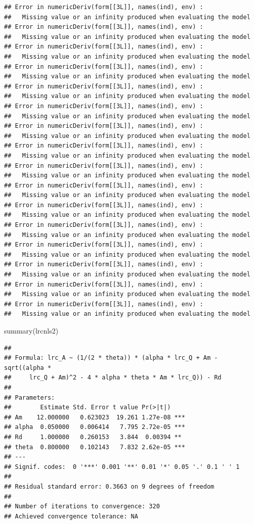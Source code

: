 \documentclass[
]{krantz}
\makeatletter
\newenvironment{Shaded}{\begin{snugshade}}{\end{snugshade}}
\newcommand{\FunctionTok}[1]{\textcolor[rgb]{0.00,0.00,0.00}{#1}}
\newcommand{\NormalTok}[1]{#1}
\newenvironment{kframe}{%
\medskip{}
\setlength{\fboxsep}{.8em}
 \def\at@end@of@kframe{}%
 \ifinner\ifhmode%
  \def\at@end@of@kframe{\end{minipage}}%
  \begin{minipage}{\columnwidth}%
 \fi\fi%
 \def\FrameCommand##1{\hskip\@totalleftmargin \hskip-\fboxsep
 \colorbox{shadecolor}{##1}\hskip-\fboxsep
     \hskip-\linewidth \hskip-\@totalleftmargin \hskip\columnwidth}%
 \MakeFramed {\advance\hsize-\width
   \@totalleftmargin\z@ \linewidth\hsize
   \@setminipage}}%
 {\par\unskip\endMakeFramed%
 \at@end@of@kframe}
\renewenvironment{Shaded}{\begin{kframe}}{\end{kframe}}
\makeatother
\begin{document}
\begin{verbatim}
## Error in numericDeriv(form[[3L]], names(ind), env) : 
##   Missing value or an infinity produced when evaluating the model
## Error in numericDeriv(form[[3L]], names(ind), env) : 
##   Missing value or an infinity produced when evaluating the model
## Error in numericDeriv(form[[3L]], names(ind), env) : 
##   Missing value or an infinity produced when evaluating the model
## Error in numericDeriv(form[[3L]], names(ind), env) : 
##   Missing value or an infinity produced when evaluating the model
## Error in numericDeriv(form[[3L]], names(ind), env) : 
##   Missing value or an infinity produced when evaluating the model
## Error in numericDeriv(form[[3L]], names(ind), env) : 
##   Missing value or an infinity produced when evaluating the model
## Error in numericDeriv(form[[3L]], names(ind), env) : 
##   Missing value or an infinity produced when evaluating the model
## Error in numericDeriv(form[[3L]], names(ind), env) : 
##   Missing value or an infinity produced when evaluating the model
## Error in numericDeriv(form[[3L]], names(ind), env) : 
##   Missing value or an infinity produced when evaluating the model
## Error in numericDeriv(form[[3L]], names(ind), env) : 
##   Missing value or an infinity produced when evaluating the model
## Error in numericDeriv(form[[3L]], names(ind), env) : 
##   Missing value or an infinity produced when evaluating the model
## Error in numericDeriv(form[[3L]], names(ind), env) : 
##   Missing value or an infinity produced when evaluating the model
## Error in numericDeriv(form[[3L]], names(ind), env) : 
##   Missing value or an infinity produced when evaluating the model
## Error in numericDeriv(form[[3L]], names(ind), env) : 
##   Missing value or an infinity produced when evaluating the model
## Error in numericDeriv(form[[3L]], names(ind), env) : 
##   Missing value or an infinity produced when evaluating the model
## Error in numericDeriv(form[[3L]], names(ind), env) : 
##   Missing value or an infinity produced when evaluating the model
\end{verbatim}

\begin{Shaded}
\begin{Highlighting}[]
\FunctionTok{summary}\NormalTok{(lrcnls2)}
\end{Highlighting}
\end{Shaded}

\begin{verbatim}
## 
## Formula: lrc_A ~ (1/(2 * theta)) * (alpha * lrc_Q + Am - sqrt((alpha * 
##     lrc_Q + Am)^2 - 4 * alpha * theta * Am * lrc_Q)) - Rd
## 
## Parameters:
##        Estimate Std. Error t value Pr(>|t|)    
## Am    12.000000   0.623023  19.261 1.27e-08 ***
## alpha  0.050000   0.006414   7.795 2.72e-05 ***
## Rd     1.000000   0.260153   3.844  0.00394 ** 
## theta  0.800000   0.102143   7.832 2.62e-05 ***
## ---
## Signif. codes:  0 '***' 0.001 '**' 0.01 '*' 0.05 '.' 0.1 ' ' 1
## 
## Residual standard error: 0.3663 on 9 degrees of freedom
## 
## Number of iterations to convergence: 320 
## Achieved convergence tolerance: NA
\end{verbatim}
\end{document}

